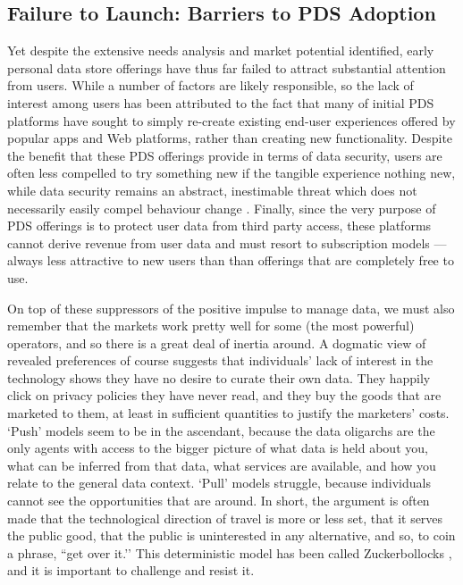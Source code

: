 \documentclass{acm_proc_article-sp}
\begin{document}
\subsection{Failure to Launch: Barriers to PDS Adoption}

Yet despite the extensive needs analysis and market potential identified, early personal data store offerings have thus far failed to attract substantial attention from users.  While a number of factors are likely responsible, so the lack of interest among users has been attributed to the fact that many of initial PDS platforms have sought to simply re-create existing end-user experiences offered by popular apps and Web platforms, rather than creating new functionality.  Despite the benefit that these PDS offerings provide in terms of data security, users are often less compelled to try something new if the tangible experience nothing new, while data security remains an abstract, inestimable threat which does not necessarily easily compel behaviour change \cite{bandura1977self}.  Finally, since the very purpose of PDS offerings is to protect user data from third party access, these platforms cannot derive revenue from user data and must resort to subscription models --- always less attractive to new users than than offerings that are completely free to use. 

On top of these suppressors of the positive impulse to manage data, we must also remember that the markets work pretty well for some (the most powerful) operators, and so there is a great deal of inertia around. A dogmatic view of revealed preferences of course suggests that individuals’ lack of interest in the technology shows they have no desire to curate their own data. They happily click on privacy policies they have never read, and they buy the goods that are marketed to them, at least in sufficient quantities to justify the marketers’ costs. `Push’ models seem to be in the ascendant, because the data oligarchs are the only agents with access to the bigger picture of what data is held about you, what can be inferred from that data, what services are available, and how you relate to the general data context. `Pull’ models struggle, because individuals cannot see the opportunities that are around. In short, the argument is often made that the technological direction of travel is more or less set, that it serves the public good, that the public is uninterested in any alternative, and so, to coin a phrase, ``get over it.’’ This deterministic model has been called Zuckerbollocks \cite{ohara2013}, and it is important to challenge and resist it.
\end{document}
